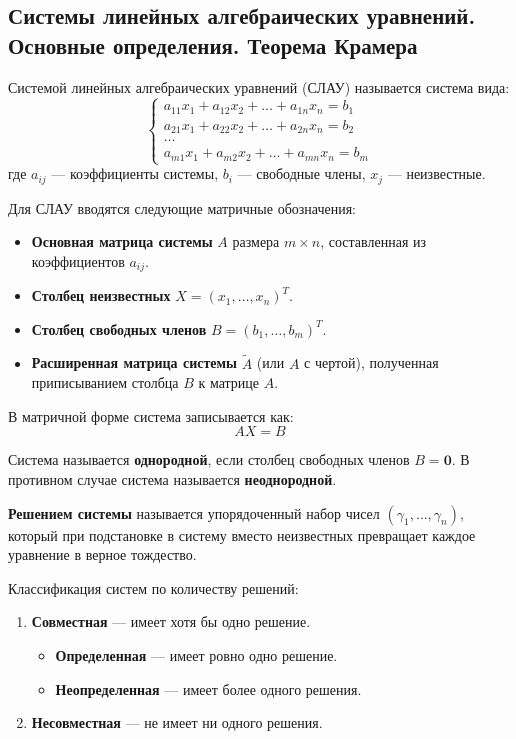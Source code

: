 \subsection{Системы линейных алгебраических уравнений. Основные определения. Теорема Крамера}

\begin{definition}
Системой линейных алгебраических уравнений (СЛАУ) называется система вида:
\[
\begin{cases}
a_{11}x_1 + a_{12}x_2 + \dots + a_{1n}x_n = b_1 \\
a_{21}x_1 + a_{22}x_2 + \dots + a_{2n}x_n = b_2 \\
\dots \\
a_{m1}x_1 + a_{m2}x_2 + \dots + a_{mn}x_n = b_m
\end{cases}
\]
где $a_{ij}$ — коэффициенты системы, $b_i$ — свободные члены, $x_j$ — неизвестные.
\end{definition}

Для СЛАУ вводятся следующие матричные обозначения:
\begin{itemize}
    \item \textbf{Основная матрица системы} $A$ размера $m \times n$, составленная из коэффициентов $a_{ij}$.
    \item \textbf{Столбец неизвестных} $X = (x_1, \dots, x_n)^T$.
    \item \textbf{Столбец свободных членов} $B = (b_1, \dots, b_m)^T$.
    \item \textbf{Расширенная матрица системы} $\tilde{A}$ (или $A$ с чертой), полученная приписыванием столбца $B$ к матрице $A$.
\end{itemize}

В матричной форме система записывается как:
\[ AX = B \]

\begin{definition}
Система называется \textbf{однородной}, если столбец свободных членов $B = \mathbf{0}$. В противном случае система называется \textbf{неоднородной}.
\end{definition}

\begin{definition}
\textbf{Решением системы} называется упорядоченный набор чисел $(\gamma_1, \dots, \gamma_n)$, который при подстановке в систему вместо неизвестных превращает каждое уравнение в верное тождество.
\end{definition}

Классификация систем по количеству решений:
\begin{enumerate}
    \item \textbf{Совместная} — имеет хотя бы одно решение.
    \begin{itemize}
        \item \textbf{Определенная} — имеет ровно одно решение.
        \item \textbf{Неопределенная} — имеет более одного решения.
    \end{itemize}
    \item \textbf{Несовместная} — не имеет ни одного решения.
\end{enumerate}

